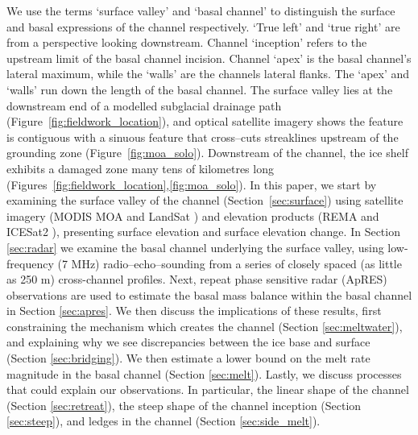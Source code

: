 We use the terms `surface valley' and `basal channel' to distinguish the surface and basal expressions of the channel respectively. `True left' and `true right' are from a perspective looking downstream. Channel `inception' refers to the upstream limit of the basal channel incision. Channel `apex' is the basal channel's lateral maximum, while the `walls' are the channels lateral flanks. The `apex' and `walls' run down the length of the basal channel.  The surface valley lies at the downstream end of a modelled subglacial drainage path (Figure~\ref{fig:fieldwork_location}), and optical satellite imagery shows the feature is contiguous with a sinuous feature that cross--cuts streaklines upstream of the grounding zone (Figure~\ref{fig:moa_solo}). Downstream of the channel, the ice shelf exhibits a damaged zone many tens of kilometres long (Figures~\ref{fig:fieldwork_location},\ref{fig:moa_solo}).
In this paper, we start by examining the surface valley of the channel (Section~\ref{sec:surface}) using satellite imagery (MODIS MOA \cite{haran2014modis} and LandSat \cite{RoyLandsat8Scienceproduct2014}) and elevation products (REMA \cite{howat2019reference} and ICESat2 \cite{smith2021v3}), presenting surface elevation and surface elevation change. 
In Section \ref{sec:radar} we examine the basal channel underlying the surface valley, using low-frequency (7 MHz) radio--echo--sounding from a series of closely spaced (as little as 250 m) cross-channel profiles. Next, repeat phase sensitive radar (ApRES) observations are used to estimate the basal mass balance within the basal channel in Section \ref{sec:apres}.
We then discuss the implications of these results, first constraining the mechanism which creates the channel (Section \ref{sec:meltwater}), and explaining why we see discrepancies between the ice base and surface (Section \ref{sec:bridging}). We then estimate a lower bound on the melt rate magnitude in the basal channel (Section \ref{sec:melt}). 
Lastly, we discuss processes that could explain our observations. In particular, the linear shape of the channel (Section \ref{sec:retreat}), the steep shape of the channel inception (Section \ref{sec:steep}), and ledges in the channel (Section \ref{sec:side_melt}).

